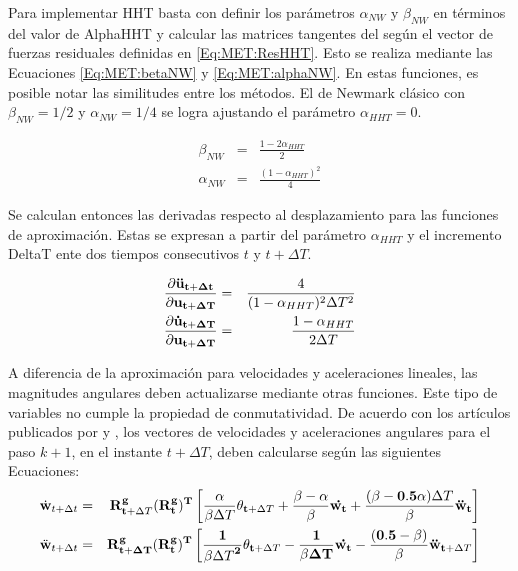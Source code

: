 Para implementar HHT basta con definir los parámetros $\alpha_{NW}$ y $\beta_{NW}$ en términos del valor de \gls{AlphaHHT} y calcular las matrices tangentes del según el vector de fuerzas residuales definidas en \ref{Eq:MET:ResHHT}. Esto se realiza mediante las Ecuaciones \eqref{Eq:MET:betaNW} y \eqref{Eq:MET:alphaNW}. En estas funciones, es posible notar las similitudes entre los métodos. El de Newmark clásico con $\beta_{NW}=1/2$ y $\alpha_{NW} =1/4$ se logra ajustando el parámetro $\alpha_{HHT}=0$. 

\begin{eqnarray}
	\label{Eq:MET:betaNW}
	\beta_{NW} &=& \frac{1-2\alpha_{HHT}}{2}\\
	\label{Eq:MET:alphaNW}
	\alpha_{NW} &=& \frac{(1-\alpha_{HHT})^2}{4}
\end{eqnarray}

Se calculan entonces las derivadas respecto al desplazamiento para las funciones de aproximación. Estas se expresan a partir del parámetro $\alpha_{HHT}$ y el incremento \gls{DeltaT} ente dos tiempos consecutivos $t$ y $t+\Delta T$.

\begin{eqnarray}
	\label{Eq:Met:DerivadasAcelLinear}
	\frac{\partial \bf{\ddot{u}_{t+\Delta t}}}{\partial \bf{{u}_{t+\Delta T}}}& = &
	\frac{4}{(1-\alpha_{HHT})^2 \Delta T^2}\\
	\label{Eq:Met:DerivadasVelLinear}
	\frac{\partial \bf{\dot{u}_{t+\Delta T}}}{\partial \bf{{u}_{t+\Delta T}}}& = &
	\frac{1-\alpha_{HHT}}{2\Delta T}
\end{eqnarray}

A diferencia de la aproximación para velocidades y aceleraciones lineales, las magnitudes angulares deben actualizarse mediante otras funciones. Este tipo de variables no cumple la propiedad de conmutatividad. De acuerdo con los artículos publicados por \cite{ibrahimbegovic1998finite} y \cite{ibrahimbegovic2002energy}, los vectores de velocidades y aceleraciones angulares para el paso $k+1$, en el instante $t+\Delta T$, deben calcularse según las siguientes Ecuaciones:
\begin{eqnarray}\label{Eq:MET:ActualizacionesAngulares1}
	\dot{\bf{w}}_{t+\Delta t}&=&\bf{R}^g_{t+ \text{$\Delta T$}}(\bf{R}^g_{t})^T\left[\frac{\alpha}{\beta\text{$\Delta T$}}\bf{\theta}_{t+\text{$\Delta T$}}+
	\frac{\beta-\alpha}{\beta}\bf{\dot{w_t}+\frac{(\beta-0.5\alpha)\text{$\Delta T$}}{\beta}}
	\ddot{\bf{w}}_{t} \right ]\\
	\label{Eq:MET:ActualizacionesAngulares2}
	\ddot{\bf{w}}_{t+\Delta t}&=&\bf{R}^g_{t+\Delta T}(\bf{R}^g_{t})^T\left[\frac{1}{\beta\text{$\Delta T$}^2}\bf{\theta}_{t+\text{$\Delta T$}}-
	\frac{1}{\beta \Delta T}\bf{\dot{w_t}-\frac{(0.5-\beta)}{\beta}}
	\ddot{\bf{w}}_{t+\text{$\Delta T$}} \right ]
\end{eqnarray}

